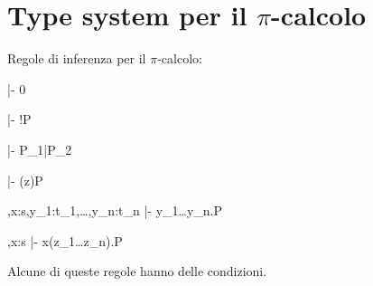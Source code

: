 \section{Type system per il \texorpdfstring{$\pi$}{pi}-calcolo}

Regole di inferenza per il $\pi$-calcolo:

\vspace{3 mm}
\indent\indent
\inference[nil]
  {}
  {\Psi |- 0}

\vspace{3 mm}
\indent\indent
{}
  {\Psi |- !P}

\vspace{3 mm}
\indent\indent
{}
  {\Psi |- P_1|P_2}

\vspace{3 mm}
\indent\indent
{}
  {\Psi |- (z)P}

\vspace{3 mm}
\indent\indent
{}
  {\Psi,x:s,y_1:t_1,\ldots,y_n:t_n |- \langle y_1\ldots y_n\rangle.P}

\vspace{3 mm}
\indent\indent
{}
  {\Psi,x:s |- x(z_1\ldots z_n).P}

\vspace{3 mm}
Alcune di queste regole hanno delle condizioni.
